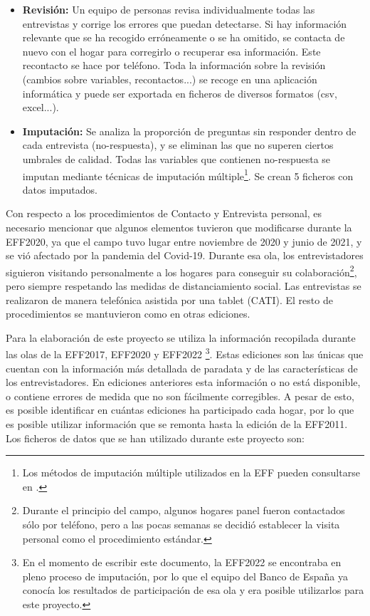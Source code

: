 \begin{itemize}
    \item \textbf{Revisión:} Un equipo de personas revisa individualmente todas las entrevistas y corrige los errores que puedan detectarse. Si hay información relevante que se ha recogido erróneamente o se ha omitido, se contacta de nuevo con el hogar para corregirlo o recuperar esa información. Este recontacto se hace por teléfono. Toda la información sobre la revisión (cambios sobre variables, recontactos...) se recoge en una aplicación informática y puede ser exportada en ficheros de diversos formatos (csv, excel...).
    \item \textbf{Imputación:} Se analiza la proporción de preguntas sin responder dentro de cada entrevista (no-respuesta), y se eliminan las que no superen ciertos umbrales de calidad. Todas las variables que contienen no-respuesta se imputan mediante técnicas de imputación múltiple\footnote{Los métodos de imputación múltiple utilizados en la EFF pueden consultarse en \cite{barcelo2006imputation}.}. Se crean 5 ficheros con datos imputados.
\end{itemize}

Con respecto a los procedimientos de Contacto y Entrevista personal, es necesario mencionar que algunos elementos tuvieron que modificarse durante la EFF2020, ya que el campo tuvo lugar entre noviembre de 2020 y junio de 2021, y se vió afectado por la pandemia del Covid-19. Durante esa ola, los entrevistadores siguieron visitando personalmente a los hogares para conseguir su colaboración\footnote{Durante el principio del campo, algunos hogares panel fueron contactados sólo por teléfono, pero a las pocas semanas se decidió establecer la visita personal como el procedimiento estándar.}, pero siempre respetando las medidas de distanciamiento social. Las entrevistas se realizaron de manera telefónica asistida por una tablet (CATI). El resto de procedimientos se mantuvieron como en otras ediciones.

Para la elaboración de este proyecto se utiliza la información recopilada durante las olas de la EFF2017, EFF2020 y EFF2022 \footnote{En el momento de escribir este documento, la EFF2022 se encontraba en pleno proceso de imputación, por lo que el equipo del Banco de España ya conocía los resultados de participación de esa ola y era posible utilizarlos para este proyecto.}. Estas ediciones son las únicas que cuentan con la información más detallada de paradata y de las características de los entrevistadores. En ediciones anteriores esta información o no está disponible, o contiene errores de medida que no son fácilmente corregibles. A pesar de esto, es posible identificar en cuántas ediciones ha participado cada hogar, por lo que es posible utilizar información que se remonta hasta la edición de la EFF2011. Los ficheros de datos que se han utilizado durante este proyecto son:

